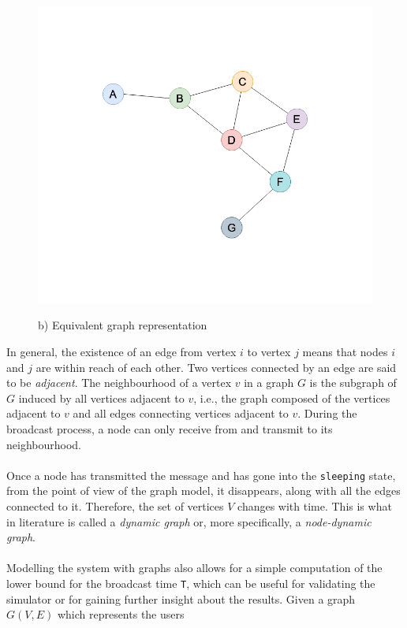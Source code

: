 \begin{figure}[H]
\begin{minipage}{.5\textwidth}
		\includegraphics[scale=.23]{img/wireless_graph_2.png}
		\begin{center}
            b) Equivalent graph representation
        \end{center}
	\end{minipage}
	\caption{}
    \label{fig:graph1}
\end{figure}
\noindent
In general, the existence of an edge from vertex $i$ to vertex $j$ means that
nodes $i$ and $j$ are within reach of each other. Two vertices connected by an
edge are said to be \textit{adjacent}. The neighbourhood of a vertex $v$ in a
graph $G$ is the subgraph of $G$ induced by all vertices adjacent to $v$, i.e.,
the graph composed of the vertices adjacent to $v$ and all edges connecting
vertices adjacent to $v$. During the broadcast process, a node can only receive
from and transmit to its neighbourhood.\\
\\
Once a node has transmitted the message and has gone into the \texttt{sleeping}
state, from the point of view of the graph model, it disappears, along with all
the edges connected to it. Therefore, the set of vertices $V$ changes with time.
This is what in literature is called a \textit{dynamic graph} or, more
specifically, a \textit{node-dynamic graph}\cite{hararygraph}.\\
\\
Modelling the system with graphs also allows for a simple computation of the
lower bound for the broadcast time \texttt{T}, which can be useful for validating the simulator or for gaining further insight about the results. Given a graph $G(V, E)$ which represents the users
